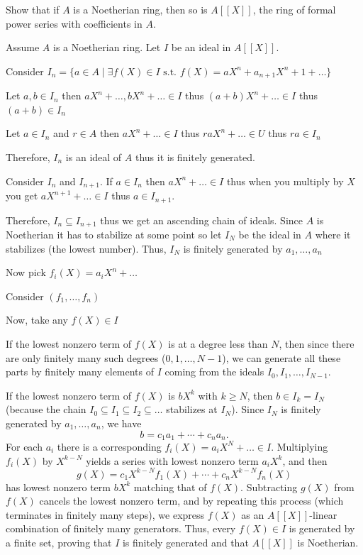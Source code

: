 \documentclass[12pt, letterpaper]{article}
\renewcommand{\t}[1]{\text{#1}}
\begin{document}
\color{\TextColor}
\pagecolor{\colormode}
\setlength{\parindent}{0pt}
\pagestyle{fancy}
\fancyhf{}
\fancyhead[ROE]{\color{\TextColor}\thepage}
\begin{problem}{}
    Show that if $A$ is a Noetherian ring, then so is $A[[X]]$, the ring of formal power series with coefficients in $A$.
\end{problem}
\begin{problemproof}
    Assume $A$ is a Noetherian ring. 
Let $I$ be an ideal in $A[[X]]$.

Consider $I_n=\{a \in A \mid \exists f(X) \in I \t{ s.t. } f(X)=aX^n+a_{n+1}X^n+1+\dots\}$

Let $a,b \in I_n$ then $aX^n+\dots,bX^n+\dots \in I$ thus $(a+b)X^n+\dots \in I$ thus $(a+b) \in I_n$

Let $a \in I_n$ and $r \in A$ then $aX^n+\dots \in I$ thus $raX^n+\dots \in U$ thus $ra \in I_n$

Therefore, $I_n$ is an ideal of $A$ thus it is finitely generated.

Consider $I_n$ and $I_{n+1}$. If $a \in I_n$ then $aX^{n}+\dots \in I$ thus when you multiply by $X$ you get $aX^{n+1}+\dots \in I$ thus $a \in I_{n+1}$.

Therefore, $I_n \subseteq I_{n+1}$ thus we get an ascending chain of ideals. Since $A$ is Noetherian it has to stabilize at some point so let $I_N$ be the ideal in $A$ where it stabilizes (the lowest number). Thus, $I_N$ is finitely generated by $a_1,\dots,a_n$

Now pick $f_i(X)=a_iX^n+\dots$ 

Consider $(f_1,\dots,f_n)$

Now, take any \(f(X) \in I\)

If the lowest nonzero term of \(f(X)\) is at a degree less than \(N\), then since there are only finitely many such degrees (\(0, 1, \dots, N-1\)), we can generate all these parts by finitely many elements of \(I\) coming from the ideals \(I_0, I_1, \dots, I_{N-1}\). 

If the lowest nonzero term of \(f(X)\) is \(bX^k\) with \(k\ge N\), then \(b\in I_k = I_N\) (because the chain \(I_0\subseteq I_1\subseteq I_2\subseteq \dots\) stabilizes at \(I_N\)). Since \(I_N\) is finitely generated by \(a_1,\dots,a_n\), we have
\[
b = c_1a_1+\cdots+c_na_n.
\]
For each \(a_i\) there is a corresponding \(f_i(X) = a_iX^N+\dots \in I\). Multiplying \(f_i(X)\) by \(X^{k-N}\) yields a series with lowest nonzero term \(a_iX^k\), and then
\[
g(X)=c_1X^{k-N}f_1(X)+\cdots+c_nX^{k-N}f_n(X)
\]
has lowest nonzero term \(bX^k\) matching that of \(f(X)\). Subtracting \(g(X)\) from \(f(X)\) cancels the lowest nonzero term, and by repeating this process (which terminates in finitely many steps), we express \(f(X)\) as an \(A[[X]]\)-linear combination of finitely many generators. Thus, every \(f(X) \in I\) is generated by a finite set, proving that \(I\) is finitely generated and that \(A[[X]]\) is Noetherian.
\end{problemproof}
\end{document}
